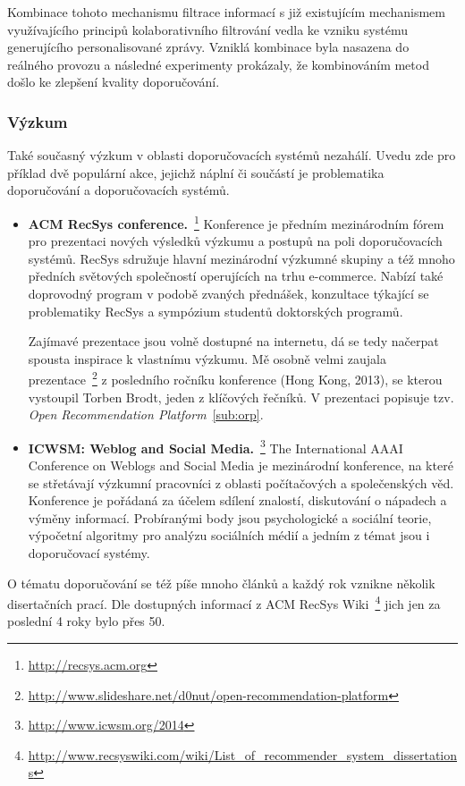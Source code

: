 \documentclass[thesis=M,czech]{FITthesis}[2014/05/07]
\begin{document}
Kombinace tohoto mechanismu filtrace informací s již existujícím mechanismem využívajícího principů kolaborativního filtrování vedla ke vzniku systému generujícího personalisované zprávy. Vzniklá kombinace byla nasazena do reálného provozu a následné experimenty prokázaly, že kombinováním metod došlo ke zlepšení kvality doporučování.

\subsubsection{Výzkum}

Také současný výzkum v oblasti doporučovacích systémů nezahálí. Uvedu zde pro příklad dvě populární akce, jejichž náplní či součástí je problematika doporučování a doporučovacích systémů.

\begin{itemize}
  \item \textbf{ACM RecSys conference.}~\footnote{\url{http://recsys.acm.org}} Konference je předním mezinárodním fórem pro prezentaci nových výsledků výzkumu a postupů na poli doporučovacích systémů. RecSys sdružuje hlavní mezinárodní výzkumné skupiny a též mnoho předních světových společností operujících na trhu e-commerce. Nabízí také doprovodný program v podobě zvaných přednášek, konzultace týkající se problematiky RecSys a sympózium studentů doktorských programů. 
  
  Zajímavé prezentace jsou volně dostupné na internetu, dá se tedy načerpat spousta inspirace k vlastnímu výzkumu. Mě osobně velmi zaujala prezentace~\footnote{\url{http://www.slideshare.net/d0nut/open-recommendation-platform}} z posledního ročníku konference (Hong Kong, 2013), se kterou vystoupil Torben Brodt, jeden z klíčových řečníků. V prezentaci popisuje tzv. \emph{Open Recommendation Platform}~\ref{sub:orp}. 
  
  \item \textbf{ICWSM: Weblog and Social Media.}~\footnote{\url{http://www.icwsm.org/2014}} The International AAAI Conference on Weblogs and Social Media je mezinárodní konference, na které se střetávají výzkumní pracovníci z oblasti počítačových a společenských věd. Konference je pořádaná za účelem sdílení znalostí, diskutování o nápadech a výměny informací. Probíranými body jsou psychologické a sociální teorie, výpočetní algoritmy pro analýzu sociálních médií a jedním z témat jsou i doporučovací systémy.
\end{itemize}

O tématu doporučování se též píše mnoho článků a každý rok vznikne několik disertačních prací. Dle dostupných informací z ACM RecSys Wiki~\footnote{\url{http://www.recsyswiki.com/wiki/List_of_recommender_system_dissertations}} jich jen za poslední 4 roky bylo přes 50.
\end{document}
